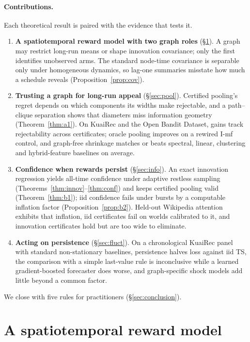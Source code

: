 \documentclass[sigconf,review,anonymous]{acmart}
\begin{document}
\paragraph{Contributions.} Each theoretical result is paired with the evidence that tests it.
\begin{enumerate}
\item \textbf{A spatiotemporal reward model with two graph roles} (\S\ref{sec:model}). A graph may restrict long-run means or shape innovation covariance; only the first identifies unobserved arms. The standard node-time covariance is separable only under homogeneous dynamics, so lag-one summaries misstate how much a schedule reveals (Proposition~\ref{prop:cov}).
\item \textbf{Trusting a graph for long-run appeal} (\S\ref{sec:pool}). Certified pooling's regret depends on which components its widths make rejectable, and a path--clique separation shows that diameters miss information geometry (Theorem~\ref{thm:a1}). On KuaiRec and the Open Bandit Dataset, gains track rejectability across certificates; oracle pooling improves on a rewired I-mf control, and graph-free shrinkage matches or beats spectral, linear, clustering and hybrid-feature baselines on average.
\item \textbf{Confidence when rewards persist} (\S\ref{sec:info}). An exact innovation regression yields all-time confidence under adaptive restless sampling (Theorems~\ref{thm:innov}--\ref{thm:conf}) and keeps certified pooling valid (Theorem~\ref{thm:b1}); iid confidence fails under bursts by a computable inflation factor (Proposition~\ref{prop:b2}). Held-out Wikipedia attention exhibits that inflation, iid certificates fail on worlds calibrated to it, and innovation certificates hold but are too wide to eliminate.
\item \textbf{Acting on persistence} (\S\ref{sec:fluct}). On a chronological KuaiRec panel with standard non-stationary baselines, persistence halves loss against iid TS, the comparison with a simple last-value rule is inconclusive while a learned gradient-boosted forecaster does worse, and graph-specific shock models add little beyond a common factor.
\end{enumerate}
We close with five rules for practitioners (\S\ref{sec:conclusion}).

\section{A spatiotemporal reward model}\label{sec:model}
\end{document}
